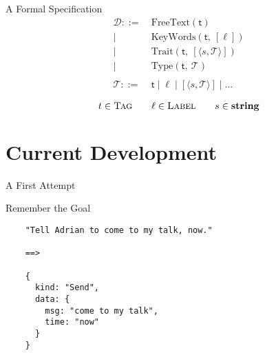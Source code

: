 \documentclass[10pt]{beamer}
\newcommand{\fcy}[1]{\mathcal{#1}}
\newcommand{\etag}[1]{\textsf{#1}}
\newcommand{\p}[2]{\langle #1, #2 \rangle}
\begin{document}
\begin{frame}[fragile]{A Formal Specification}
  \begin{align*}
    \fcy{D} ::=&\ \text{FreeText}(\etag{t}) \\
    |&\ \text{KeyWords}(\etag{t},\ [\ell]) \\
    |&\ \text{Trait}(\etag{t},\ [\p{s}{\fcy{T}}]) \\
    |&\ \text{Type}(\etag{t},\ \fcy{T}) \\
    \\
    \fcy{T} ::=&\ \etag{t} \mid \ell \mid [\p{s}{\fcy{T}}] \mid \dots
  \end{align*}

  $$ t \in \textsc{Tag} \qquad \ell \in \textsc{Label} \qquad s \in
  \textbf{string} $$
\end{frame}

\section{Current Development}

\begin{frame}[fragile]{A First Attempt}

  \begin{center}
  \end{center}
\end{frame}

\begin{frame}[fragile]{Remember the Goal}

  \begin{center}
    \begin{verbatim}
    "Tell Adrian to come to my talk, now."

    ==>

    {
      kind: "Send",
      data: {
        msg: "come to my talk",
        time: "now"
      }
    }
    \end{verbatim}
  \end{center}
\end{frame}
\end{document}

